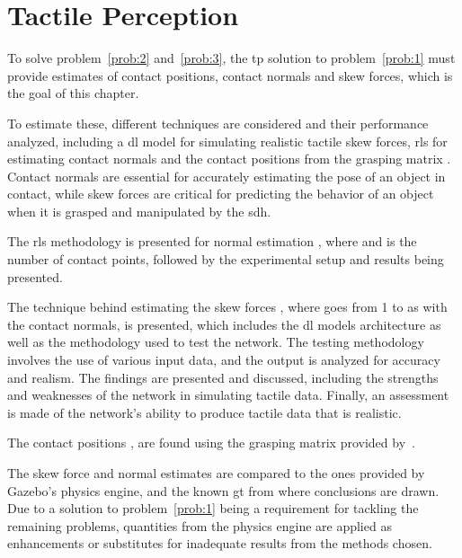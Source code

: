 \chapter{Tactile Perception}\label{ch:1-tactile-perception}


To solve problem~\ref{prob:2} and~\ref{prob:3}, the \gls{tp} solution to problem~\ref{prob:1} must provide estimates of contact positions, contact normals and skew forces, which is the goal of this chapter. \medskip

To estimate these, different techniques are considered and their performance analyzed, including a \gls{dl} model for simulating realistic tactile skew forces, \gls{rls} for estimating contact normals and the contact positions from the grasping matrix . Contact normals are essential for accurately estimating the pose of an object in contact, while skew forces are critical for predicting the behavior of an object when it is grasped and manipulated by the \gls{sdh}. \medskip

The \gls{rls} methodology is presented for normal estimation , where  and  is the number of contact points, followed by the experimental setup and results being presented.\medskip

The technique behind estimating the skew forces , where  goes from \num{1} to  as with the contact normals, is presented, which includes the \gls{dl} models architecture as well as the methodology used to test the network. The testing methodology involves the use of various input data, and the output is analyzed for accuracy and realism. The findings are presented and discussed, including the strengths and weaknesses of the network in simulating tactile data. Finally, an assessment is made of the network's ability to produce tactile data that is realistic. \medskip

The contact positions , are found using the grasping matrix  provided by~\cite{simulation-of-the-syntouch-biotac-sensor}.\medskip

The skew force and normal estimates are compared to the ones provided by Gazebo's physics engine, and the known \gls{gt} from where conclusions are drawn. Due to a solution to problem~\ref{prob:1} being a requirement for tackling the remaining problems, quantities from the physics engine are applied as enhancements or substitutes for inadequate results from the methods chosen. \medskip


